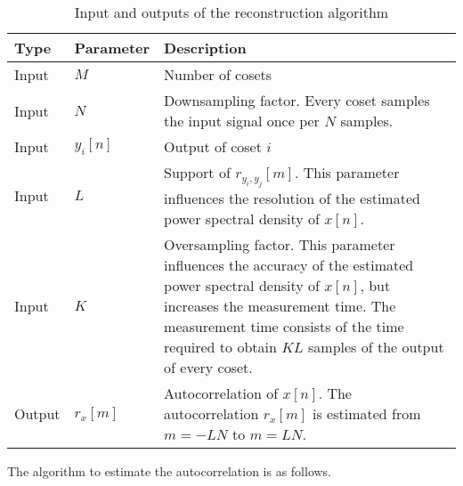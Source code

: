 \documentclass[a4paper, openany, oneside]{memoir}
\begin{document}
\begin{table}
    \centering
    \begin{tabularx}{\textwidth}{llY}
        \textbf{Type} & \textbf{Parameter} & \textbf{Description} \\ \hline
        Input & $M$ & Number of cosets \\
        Input & $N$ & Downsampling factor. Every coset samples the input signal once per $N$ samples. \\
        Input & $y_i[n]$ & Output of coset $i$ \\
        Input & $L$ & Support of $r_{y_i,y_j}[m]$. This parameter influences the resolution of the estimated power spectral density of $x[n]$. \\
        Input & $K$ & Oversampling factor. This parameter influences the accuracy of the estimated power spectral density of $x[n]$, but increases the measurement time. The measurement time consists of the time required to obtain $KL$ samples of the output of every coset. \\
        Output & $r_x[m]$ & Autocorrelation of $x[n]$. The autocorrelation $r_x[m]$ is estimated from $m=-LN$ to $m=LN$.
    \end{tabularx}
    \caption{Input and outputs of the reconstruction algorithm}
    \label{tab:reconstruction-algorithm-inputs-outputs}
\end{table}

The algorithm to estimate the autocorrelation is as follows.
\end{document}
